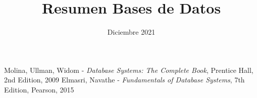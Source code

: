 \documentclass[a4paper,12pt]{report}
\begin{document}
\title{Resumen Bases de Datos}
\date{Diciembre 2021}

\maketitle
\tableofcontents






\begin{thebibliography}{9}
	 Molina, Ullman, Widom - \emph{Database Systems: The Complete Book}, Prentice Hall, 2nd Edition, 2009
	 Elmasri, Navathe - \emph{Fundamentals of
Database Systems}, 7th Edition, Pearson, 2015
\end{thebibliography}
\end{document}
